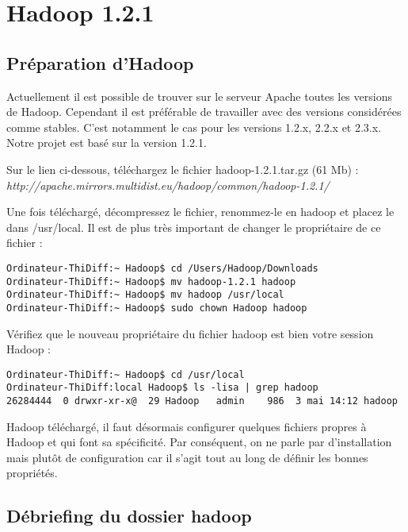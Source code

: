 \section{Hadoop 1.2.1}
\subsection{Préparation d'Hadoop}

\par Actuellement il est possible de trouver sur le serveur Apache toutes les versions de Hadoop. Cependant il est préférable de travailler avec des versions considérées comme stables. C'est notamment le cas pour les versions 1.2.x, 2.2.x et 2.3.x. Notre projet est basé sur la version 1.2.1.

\par Sur le lien ci-dessous, téléchargez le fichier hadoop-1.2.1.tar.gz  (61 Mb) :\\
\textit{http://apache.mirrors.multidist.eu/hadoop/common/hadoop-1.2.1/}

\par Une fois téléchargé, décompressez le fichier, renommez-le en hadoop et placez le dans /usr/local. Il est de plus très important de changer le propriétaire de ce fichier :

\begin{verbatim}
Ordinateur-ThiDiff:~ Hadoop$ cd /Users/Hadoop/Downloads
Ordinateur-ThiDiff:~ Hadoop$ mv hadoop-1.2.1 hadoop
Ordinateur-ThiDiff:~ Hadoop$ mv hadoop /usr/local
Ordinateur-ThiDiff:~ Hadoop$ sudo chown Hadoop hadoop
\end{verbatim}

\par Vérifiez que le nouveau propriétaire du fichier hadoop est bien votre session Hadoop :

\begin{verbatim}
Ordinateur-ThiDiff:~ Hadoop$ cd /usr/local
Ordinateur-ThiDiff:local Hadoop$ ls -lisa | grep hadoop
26284444  0 drwxr-xr-x@  29 Hadoop   admin    986  3 mai 14:12 hadoop
\end{verbatim}

\par Hadoop téléchargé, il faut désormais configurer quelques fichiers propres à Hadoop et qui font sa spécificité. Par conséquent, on ne parle par  d'installation mais plutôt de configuration car il s'agit tout au long de définir les bonnes propriétés.

\subsection{Débriefing du dossier hadoop}

